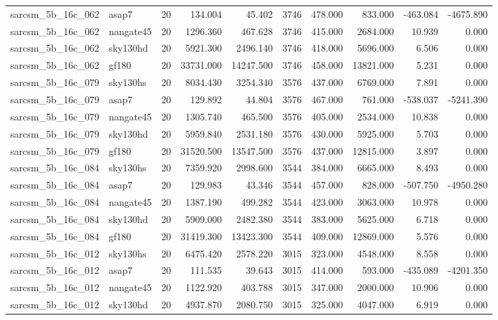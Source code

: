 \begin{longtable}{llrrrrrrrr}
sarcsm\_5b\_16c\_062 & asap7 & 20 & 134.004 & 45.402 & 3746 & 478.000 & 833.000 & -463.084 & -4675.890 \\
sarcsm\_5b\_16c\_062 & nangate45 & 20 & 1296.360 & 467.628 & 3746 & 415.000 & 2684.000 & 10.939 & 0.000 \\
sarcsm\_5b\_16c\_062 & sky130hd & 20 & 5921.300 & 2496.140 & 3746 & 418.000 & 5696.000 & 6.506 & 0.000 \\
sarcsm\_5b\_16c\_062 & gf180 & 20 & 33731.000 & 14247.500 & 3746 & 458.000 & 13821.000 & 5.231 & 0.000 \\
sarcsm\_5b\_16c\_079 & sky130hs & 20 & 8034.430 & 3254.340 & 3576 & 437.000 & 6769.000 & 7.891 & 0.000 \\
sarcsm\_5b\_16c\_079 & asap7 & 20 & 129.892 & 44.804 & 3576 & 467.000 & 761.000 & -538.037 & -5241.390 \\
sarcsm\_5b\_16c\_079 & nangate45 & 20 & 1305.740 & 465.500 & 3576 & 405.000 & 2534.000 & 10.838 & 0.000 \\
sarcsm\_5b\_16c\_079 & sky130hd & 20 & 5959.840 & 2531.180 & 3576 & 430.000 & 5925.000 & 5.703 & 0.000 \\
sarcsm\_5b\_16c\_079 & gf180 & 20 & 31520.500 & 13547.500 & 3576 & 437.000 & 12815.000 & 3.897 & 0.000 \\
sarcsm\_5b\_16c\_084 & sky130hs & 20 & 7359.920 & 2998.600 & 3544 & 384.000 & 6665.000 & 8.493 & 0.000 \\
sarcsm\_5b\_16c\_084 & asap7 & 20 & 129.983 & 43.346 & 3544 & 457.000 & 828.000 & -507.750 & -4950.280 \\
sarcsm\_5b\_16c\_084 & nangate45 & 20 & 1387.190 & 499.282 & 3544 & 423.000 & 3063.000 & 10.978 & 0.000 \\
sarcsm\_5b\_16c\_084 & sky130hd & 20 & 5909.000 & 2482.380 & 3544 & 383.000 & 5625.000 & 6.718 & 0.000 \\
sarcsm\_5b\_16c\_084 & gf180 & 20 & 31419.300 & 13423.300 & 3544 & 409.000 & 12869.000 & 5.576 & 0.000 \\
sarcsm\_5b\_16c\_012 & sky130hs & 20 & 6475.420 & 2578.220 & 3015 & 323.000 & 4548.000 & 8.558 & 0.000 \\
sarcsm\_5b\_16c\_012 & asap7 & 20 & 111.535 & 39.643 & 3015 & 414.000 & 593.000 & -435.089 & -4201.350 \\
sarcsm\_5b\_16c\_012 & nangate45 & 20 & 1122.920 & 403.788 & 3015 & 347.000 & 2000.000 & 10.906 & 0.000 \\
sarcsm\_5b\_16c\_012 & sky130hd & 20 & 4937.870 & 2080.750 & 3015 & 325.000 & 4047.000 & 6.919 & 0.000 \\

\end{longtable}

